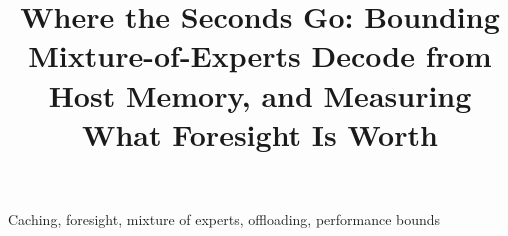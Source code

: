 \documentclass[conference]{IEEEtran}
\begin{document}
\title{Where the Seconds Go: Bounding Mixture-of-Experts Decode from Host Memory, and Measuring What Foresight Is Worth}
\maketitle
\begingroup\renewcommand\thefootnote{}\endgroup

\begin{abstract}

\end{abstract}

\begin{IEEEkeywords}
Caching, foresight, mixture of experts, offloading, performance bounds
\end{IEEEkeywords}





\end{document}
